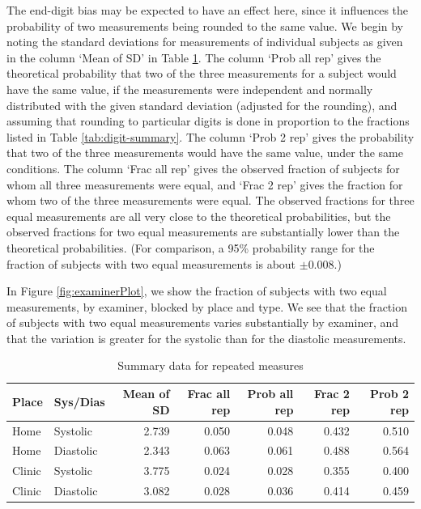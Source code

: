 \documentclass[
]{article}
\begin{document}
The end-digit bias may be expected to have an effect here, since it influences the probability of two measurements being rounded to the same value.
We begin by noting the standard deviations for measurements of individual subjects as given in the column `Mean of SD' in Table \ref{tab:sd-summary}.
The column `Prob all rep' gives the theoretical probability that two of the three measurements for a subject would have the same value, if the measurements were independent and normally distributed with the given standard deviation (adjusted for the rounding), and assuming that rounding to particular digits is done in proportion to the fractions listed in Table \ref{tab:digit-summary}.
The column `Prob 2 rep' gives the probability that two of the three measurements would have the same value, under the same conditions.
The column `Frac all rep' gives the observed fraction of subjects for whom all three measurements were equal, and `Frac 2 rep' gives the fraction for whom two of the three measurements were equal.
The observed fractions for three equal measurements are all very close to the theoretical probabilities, but the observed fractions for two equal measurements are substantially lower than the theoretical probabilities.
(For comparison, a 95\% probability range for the fraction of subjects with two equal measurements is about \(\pm 0.008\).)

In Figure \ref{fig:examinerPlot}, we show the fraction of subjects with two equal measurements, by examiner, blocked by place and type.
We see that the fraction of subjects with two equal measurements varies substantially by examiner, and that the variation is greater for the systolic than for the diastolic measurements.

\begin{table}[!h]

\caption{\label{tab:sd-summary}Summary data for repeated measures}
\centering
\begin{tabular}[t]{llrrrrr}
\toprule
Place & Sys/Dias & Mean of SD & Frac all rep & Prob all rep & Frac 2 rep & Prob 2 rep\\
\midrule
Home & Systolic & 2.739 & 0.050 & 0.048 & 0.432 & 0.510\\
Home & Diastolic & 2.343 & 0.063 & 0.061 & 0.488 & 0.564\\
Clinic & Systolic & 3.775 & 0.024 & 0.028 & 0.355 & 0.400\\
Clinic & Diastolic & 3.082 & 0.028 & 0.036 & 0.414 & 0.459\\
\bottomrule
\end{tabular}
\end{table}
\end{document}
